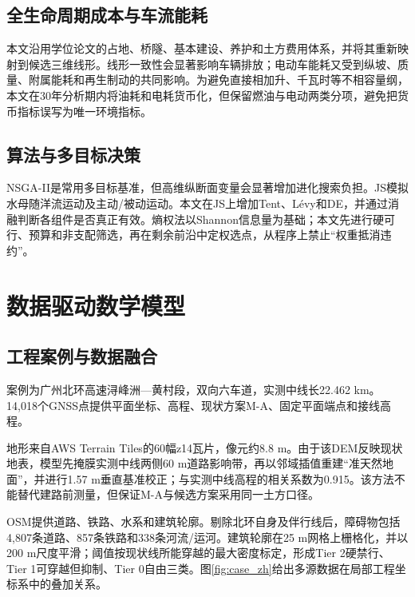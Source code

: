 \documentclass[preprint,12pt]{elsarticle}
\begin{document}
\subsection{全生命周期成本与车流能耗}

本文沿用学位论文\cite{lin2025}的占地、桥隧、基本建设、养护和土方费用体系，并将其重新映射到候选三维线形。线形一致性会显著影响车辆排放\cite{llopis2019}；电动车能耗又受到纵坡、质量、附属能耗和再生制动的共同影响\cite{dimartino2022}。为避免直接相加升、千瓦时等不相容量纲，本文在30年分析期内将油耗和电耗货币化，但保留燃油与电动两类分项，避免把货币指标误写为唯一环境指标。

\subsection{算法与多目标决策}

NSGA-II是常用多目标基准\cite{deb2002}，但高维纵断面变量会显著增加进化搜索负担。JS模拟水母随洋流运动及主动/被动运动\cite{chou2021}。本文在JS上增加Tent、L\'evy和DE\cite{storn1997}，并通过消融判断各组件是否真正有效。熵权法以Shannon信息量为基础\cite{shannon1948}；本文先进行硬可行、预算和非支配筛选，再在剩余前沿中定权选点，从程序上禁止“权重抵消违约”。

\section{数据驱动数学模型}

\subsection{工程案例与数据融合}

案例为广州北环高速浔峰洲—黄村段，双向六车道，实测中线长22.462 km。14,018个GNSS点提供平面坐标、高程、现状方案M-A、固定平面端点和接线高程。

地形来自AWS Terrain Tiles\cite{awsterrain}的60幅z14瓦片，像元约8.8 m。由于该DEM反映现状地表，模型先掩膜实测中线两侧60 m道路影响带，再以邻域插值重建“准天然地面”，并进行1.57 m垂直基准校正；与实测中线高程的相关系数为0.915。该方法不能替代建路前测量，但保证M-A与候选方案采用同一土方口径。

OSM\cite{haklay2008,osmlicense}提供道路、铁路、水系和建筑轮廓。剔除北环自身及伴行线后，障碍物包括4,807条道路、857条铁路和338条河流/运河。建筑轮廓在25 m网格上栅格化，并以200 m尺度平滑；阈值按现状线所能穿越的最大密度标定，形成Tier 2硬禁行、Tier 1可穿越但抑制、Tier 0自由三类。图\ref{fig:case_zh}给出多源数据在局部工程坐标系中的叠加关系。
\end{document}
